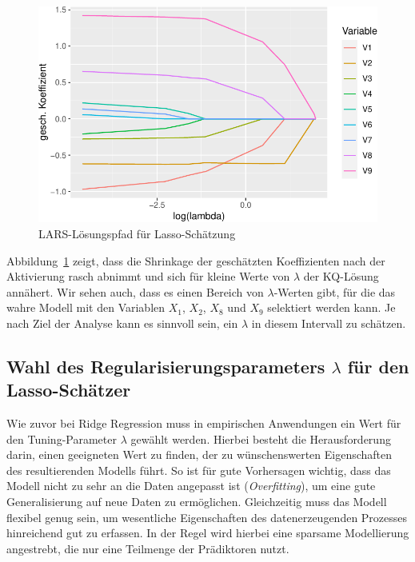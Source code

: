 \documentclass[
  a4paper,
  DIV=11,
  oneside]{scrreprt}
\begin{document}
\begin{figure}[t]

{\centering \includegraphics{RegReg_files/figure-pdf/fig-larssolpath-1.pdf}

}

\caption{\label{fig-larssolpath}LARS-Lösungspfad für Lasso-Schätzung}

\end{figure}

Abbildung~\ref{fig-larssolpath} zeigt, dass die Shrinkage der
geschätzten Koeffizienten nach der Aktivierung rasch abnimmt und sich
für kleine Werte von \(\lambda\) der KQ-Lösung annähert. Wir sehen auch,
dass es einen Bereich von \(\lambda\)-Werten gibt, für die das wahre
Modell mit den Variablen \(X_1\), \(X_2\), \(X_8\) und \(X_9\)
selektiert werden kann. Je nach Ziel der Analyse kann es sinnvoll sein,
ein \(\lambda\) in diesem Intervall zu schätzen.

\hypertarget{wahl-des-regularisierungsparameters-lambda-fuxfcr-den-lasso-schuxe4tzer}{%
\subsection{\texorpdfstring{Wahl des Regularisierungsparameters
\(\lambda\) für den
Lasso-Schätzer}{Wahl des Regularisierungsparameters \textbackslash lambda für den Lasso-Schätzer}}\label{wahl-des-regularisierungsparameters-lambda-fuxfcr-den-lasso-schuxe4tzer}}

Wie zuvor bei Ridge Regression muss in empirischen Anwendungen ein Wert
für den Tuning-Parameter \(\lambda\) gewählt werden. Hierbei besteht die
Herausforderung darin, einen geeigneten Wert zu finden, der zu
wünschenswerten Eigenschaften des resultierenden Modells führt. So ist
für gute Vorhersagen wichtig, dass das Modell nicht zu sehr an die Daten
angepasst ist (\emph{Overfitting}), um eine gute Generalisierung auf
neue Daten zu ermöglichen. Gleichzeitig muss das Modell flexibel genug
sein, um wesentliche Eigenschaften des datenerzeugenden Prozesses
hinreichend gut zu erfassen. In der Regel wird hierbei eine sparsame
Modellierung angestrebt, die nur eine Teilmenge der Prädiktoren nutzt.
\end{document}
